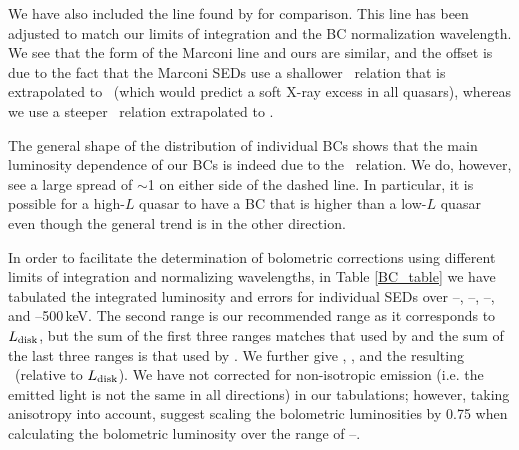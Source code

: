We have also included the line found by \citet[][maroon]{Marconi:2004} for comparison.  This line has been adjusted to match our limits of integration and the BC normalization wavelength.  We see that the form of the Marconi line and ours are similar,
and the offset is due to the fact that the Marconi SEDs use a shallower \luvaox\ relation that is extrapolated to \twokev\ (which would predict a soft X-ray excess in all quasars), whereas we use a steeper \luvaox\ relation extrapolated to \twohundredev.

The general shape of the distribution of individual BCs shows that the main luminosity dependence of our BCs is indeed due to the \luvaox\ relation.  We do, however, see a large spread of $\sim$1 on either side of the dashed line.
In particular, it is possible for a high-$L$ quasar to have a BC that is higher than a low-$L$ quasar even though the general trend is in the other direction.

In order to facilitate the determination of bolometric corrections using different limits of integration and normalizing wavelengths, in Table \ref{BC_table} we have tabulated the integrated luminosity and errors for individual SEDs over \thirtymum--\onemum, \onemum--\twokev, \twokev --\tenkev, and \tenkev--500\,keV.  The second range is our recommended range as it corresponds to $L_{\rm disk}$, but the sum of the first three ranges matches that used by \citet{Richards:2006} and the sum of the last three ranges is that used by \citet{Marconi:2004}. We further give \lfiveone, \ltwofive, and the resulting \bctwofive\ (relative to $L_{\rm disk}$).  We have not corrected for non-isotropic emission (i.e. the emitted light is not the same in all directions) in our tabulations; however, taking anisotropy into account, \citet{Runnoe:2012} suggest scaling the bolometric luminosities by 0.75 when calculating the bolometric luminosity over the range of \onemum--\tenkev.

